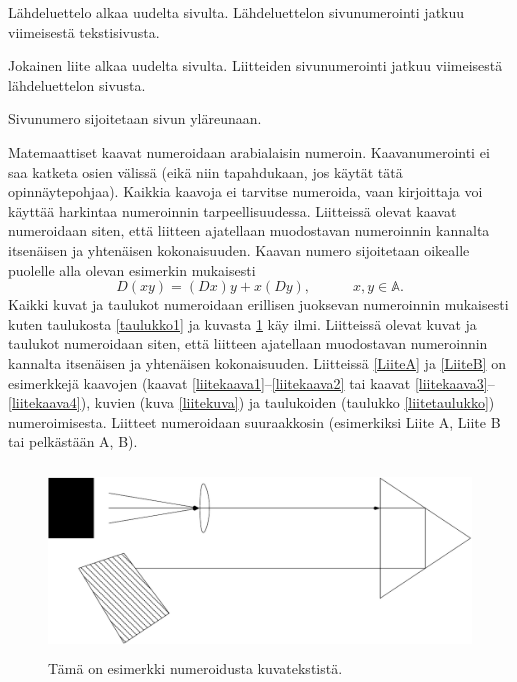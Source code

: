 \documentclass[english,12pt,a4paper,pdftex,elec,utf8]{aaltothesis}
\begin{document}
L\"ahdeluettelo alkaa uudelta sivulta. L\"ahdeluettelon sivunumerointi
jatkuu viimeisest\"a tekstisivusta.

Jokainen liite alkaa uudelta sivulta. Liitteiden sivunumerointi
jatkuu viimeisest\"a l\"ahdeluettelon sivusta.

Sivunumero sijoitetaan sivun yl\"areunaan.

Matemaattiset kaavat numeroidaan arabialaisin
numeroin. Kaavanumerointi ei saa katketa osien v\"aliss\"a (eik\"a niin
tapahdukaan, jos k\"ayt\"at t\"at\"a opinn\"aytepohjaa). Kaikkia kaavoja ei tarvitse
numeroida, vaan kirjoittaja voi k\"aytt\"a\"a harkintaa numeroinnin
tarpeellisuudessa.  Liitteiss\"a olevat kaavat numeroidaan siten, ett\"a
liitteen ajatellaan muodostavan numeroinnin kannalta itsen\"aisen ja
yhten\"aisen kokonaisuuden. Kaavan numero sijoitetaan oikealle puolelle
alla olevan esimerkin mukaisesti
\begin{equation}
D(xy) = (Dx)y + x(Dy),  \hspace{3em} x,y \in \mathbb{A}.
\end{equation}
Kaikki kuvat ja taulukot numeroidaan erillisen juoksevan numeroinnin
mukaisesti kuten taulukosta \ref{taulukko1} ja kuvasta \ref{kuva1} k\"ay
ilmi.  Liitteiss\"a olevat kuvat ja taulukot numeroidaan siten, ett\"a
liitteen ajatellaan muodostavan numeroinnin kannalta itsen\"aisen ja
yhten\"aisen kokonaisuuden. Liitteiss\"a \ref{LiiteA} ja \ref{LiiteB} on
esimerkkej\"a kaavojen (kaavat \ref{liitekaava1}--\ref{liitekaava2} tai
kaavat \ref{liitekaava3}--\ref{liitekaava4}), kuvien (kuva
\ref{liitekuva}) ja taulukoiden (taulukko \ref{liitetaulukko})
numeroimisesta.  Liitteet numeroidaan suuraakkosin (esimerkiksi Liite
A, Liite B tai pelk\"ast\"a\"an A, B).
\begin{figure}[htb]
\centering \includegraphics[height=5cm]{kuva1}
\caption{T\"am\"a on esimerkki numeroidusta kuvatekstist\"a. \label{kuva1}}
\end{figure}
\end{document}
